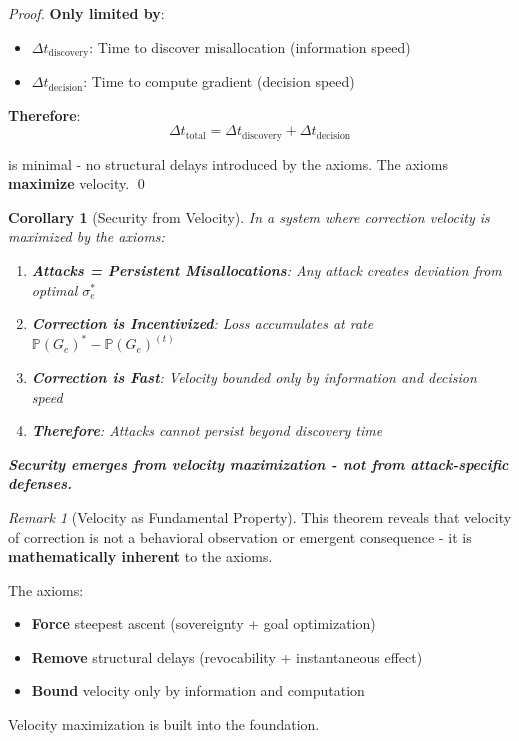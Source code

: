 \documentclass[11pt,a4paper]{article}
\newtheorem{corollary}[theorem]{Corollary}
\theoremstyle{definition}
\theoremstyle{remark}
\newtheorem{remark}[theorem]{Remark}
\begin{document}
\begin{proof}
\textbf{Only limited by}:
\begin{itemize}
\item $\Delta t_{\text{discovery}}$: Time to discover misallocation (information speed)
\item $\Delta t_{\text{decision}}$: Time to compute gradient (decision speed)
\end{itemize}

\textbf{Therefore}:
\[ \Delta t_{\text{total}} = \Delta t_{\text{discovery}} + \Delta t_{\text{decision}} \]

is minimal - no structural delays introduced by the axioms. The axioms \textbf{maximize} velocity. \qed
\end{proof}

\begin{corollary}[Security from Velocity]
\label{cor:security-from-velocity}
In a system where correction velocity is maximized by the axioms:
\begin{enumerate}
\item \textbf{Attacks = Persistent Misallocations}: Any attack creates deviation from optimal $\sigma_e^*$
\item \textbf{Correction is Incentivized}: Loss accumulates at rate $\mathbb{P}(G_e)^* - \mathbb{P}(G_e)^{(t)}$
\item \textbf{Correction is Fast}: Velocity bounded only by information and decision speed
\item \textbf{Therefore}: Attacks cannot persist beyond discovery time
\end{enumerate}

\textbf{Security emerges from velocity maximization - not from attack-specific defenses.}
\end{corollary}

\begin{remark}[Velocity as Fundamental Property]
This theorem reveals that velocity of correction is not a behavioral observation or emergent consequence - it is \textbf{mathematically inherent} to the axioms.

The axioms:
\begin{itemize}
\item \textbf{Force} steepest ascent (sovereignty + goal optimization)
\item \textbf{Remove} structural delays (revocability + instantaneous effect)
\item \textbf{Bound} velocity only by information and computation
\end{itemize}

Velocity maximization is built into the foundation.
\end{remark}
\end{document}

